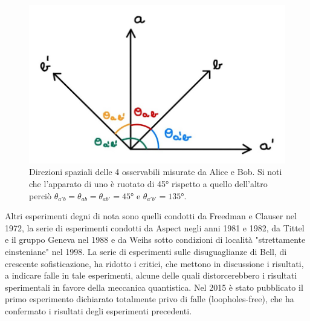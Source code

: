 \begin{figure}[!t]
    \centering
    \includegraphics[scale=0.45]{images/CHSH}
    \caption{Direzioni spaziali delle 4 osservabili misurate da Alice e Bob. Si noti che l'apparato di uno è ruotato di 45° rispetto a quello dell'altro perciò $\theta_{a'b} = \theta_{ab} = \theta_{ab'} = 45$° e $\theta_{a'b'} = 135$°.}
    \label{fig:CHSH}
\end{figure}
\noindent Altri esperimenti degni di nota sono quelli condotti da Freedman e Clauser nel 1972, la serie di esperimenti condotti da Aspect negli anni 1981 e 1982, da Tittel e il gruppo Geneva nel 1988 e da Weihs sotto condizioni di località "strettamente einsteniane" nel 1998. La serie di esperimenti sulle disuguaglianze di Bell, di crescente sofisticazione, ha ridotto i critici, che mettono in discussione i risultati, a indicare falle in tale esperimenti, alcune delle quali distorcerebbero i risultati sperimentali in favore della meccanica quantistica. Nel 2015 è stato pubblicato il primo esperimento dichiarato totalmente privo di falle (loopholes-free), che ha confermato i risultati degli esperimenti precedenti.